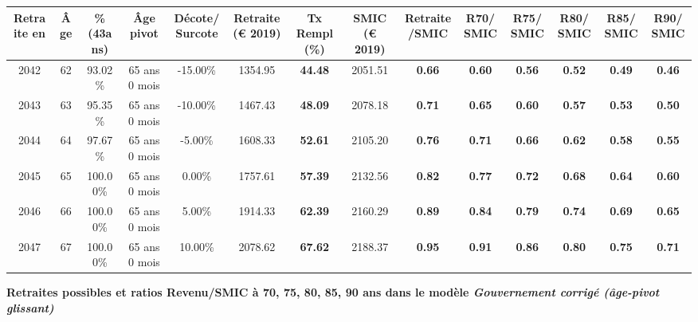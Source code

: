 \begin{adjustbox}{max width=\textwidth} 
\begin{tabular}[htb]{|c|c||c|c|c||c|c||c|c||c|c|c|c|c|} 
\hline 
 Retraite en &  Âge &  \%(43ans) &  Âge pivot &  Décote/Surcote &  Retraite (\euro{} 2019) &  Tx Rempl(\%) &  SMIC (\euro{} 2019) &  Retraite/SMIC &  R70/SMIC &  R75/SMIC &  R80/SMIC &  R85/SMIC &  R90/SMIC \\ 
\hline \hline 
 2042 &  62 &  93.02\% &  65 ans 0 mois &  -15.00\% &  1354.95 &  {\bf 44.48} &  2051.51 &  {\bf {\color{red} 0.66}} &  {\bf {\color{red} 0.60}} &  {\bf {\color{red} 0.56}} &  {\bf {\color{red} 0.52}} &  {\bf {\color{red} 0.49}} &  {\bf {\color{red} 0.46}} \\ 
\hline 
 2043 &  63 &  95.35\% &  65 ans 0 mois &  -10.00\% &  1467.43 &  {\bf 48.09} &  2078.18 &  {\bf {\color{red} 0.71}} &  {\bf {\color{red} 0.65}} &  {\bf {\color{red} 0.60}} &  {\bf {\color{red} 0.57}} &  {\bf {\color{red} 0.53}} &  {\bf {\color{red} 0.50}} \\ 
\hline 
 2044 &  64 &  97.67\% &  65 ans 0 mois &  -5.00\% &  1608.33 &  {\bf 52.61} &  2105.20 &  {\bf {\color{red} 0.76}} &  {\bf {\color{red} 0.71}} &  {\bf {\color{red} 0.66}} &  {\bf {\color{red} 0.62}} &  {\bf {\color{red} 0.58}} &  {\bf {\color{red} 0.55}} \\ 
\hline 
 2045 &  65 &  100.00\% &  65 ans 0 mois &  0.00\% &  1757.61 &  {\bf 57.39} &  2132.56 &  {\bf {\color{red} 0.82}} &  {\bf {\color{red} 0.77}} &  {\bf {\color{red} 0.72}} &  {\bf {\color{red} 0.68}} &  {\bf {\color{red} 0.64}} &  {\bf {\color{red} 0.60}} \\ 
\hline 
 2046 &  66 &  100.00\% &  65 ans 0 mois &  5.00\% &  1914.33 &  {\bf 62.39} &  2160.29 &  {\bf {\color{red} 0.89}} &  {\bf {\color{red} 0.84}} &  {\bf {\color{red} 0.79}} &  {\bf {\color{red} 0.74}} &  {\bf {\color{red} 0.69}} &  {\bf {\color{red} 0.65}} \\ 
\hline 
 2047 &  67 &  100.00\% &  65 ans 0 mois &  10.00\% &  2078.62 &  {\bf 67.62} &  2188.37 &  {\bf {\color{red} 0.95}} &  {\bf {\color{red} 0.91}} &  {\bf {\color{red} 0.86}} &  {\bf {\color{red} 0.80}} &  {\bf {\color{red} 0.75}} &  {\bf {\color{red} 0.71}} \\ 
\hline 
\hline 
\end{tabular} 
\end{adjustbox} 
 
 \vspace{0.1cm} 
{\bf \noindent Retraites possibles et ratios Revenu/SMIC à 70, 75, 80, 85, 90 ans dans le modèle \emph{Gouvernement corrigé (âge-pivot glissant)}}  
 
